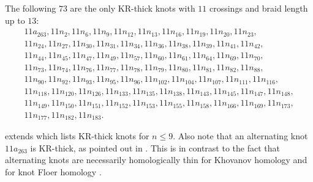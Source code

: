 \begin{proposition} \label{prop:KR-thick-11}
    The following $73$ are the only KR-thick knots with $11$ crossings and braid length up to $13$:
    \begin{gather*}
        11a_{263}, 11n_{2}, 11n_{6}, 11n_{9}, 11n_{12}, 11n_{13}, 11n_{16}, 11n_{19}, 11n_{20}, 11n_{23}, \\
        11n_{24}, 11n_{27}, 11n_{30}, 11n_{31}, 11n_{34}, 11n_{36}, 11n_{38}, 11n_{39}, 11n_{41}, 11n_{42}, \\
        11n_{44}, 11n_{45}, 11n_{47}, 11n_{49}, 11n_{57}, 11n_{60}, 11n_{61}, 11n_{64}, 11n_{69}, 11n_{70}, \\
        11n_{73}, 11n_{74}, 11n_{76}, 11n_{77}, 11n_{78}, 11n_{79}, 11n_{80}, 11n_{81}, 11n_{82}, 11n_{88}, \\
        11n_{90}, 11n_{92}, 11n_{93}, 11n_{95}, 11n_{96}, 11n_{102}, 11n_{104}, 11n_{107}, 11n_{111}, 11n_{116}, \\ 
        11n_{118}, 11n_{120}, 11n_{126}, 11n_{133}, 11n_{135}, 11n_{138}, 11n_{143}, 11n_{145}, 11n_{147}, 11n_{148}, \\
        11n_{149}, 11n_{150}, 11n_{151}, 11n_{152}, 11n_{153}, 11n_{155}, 11n_{158}, 11n_{166}, 11n_{169}, 11n_{173}, \\ 11n_{177}, 11n_{182}, 11n_{183}.
    \end{gather*}
\end{proposition}

 extends \cite[Proposition 7.10]{Ras15} which lists KR-thick knots for $n \leq 9$. Also note that an alternating knot $11a_{263}$ is KR-thick, as pointed out in \cite{Ras07}. This is in contrast to the fact that alternating knots are necessarily homologically thin for Khovanov homology \cite{Lee:2005} and for knot Floer homology \cite{OS:2003}. 